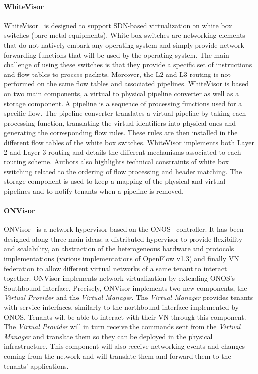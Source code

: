\paragraph{WhiteVisor}
WhiteVisor~\cite{whitevisor-Yu2019} is designed to support SDN-based virtualization on white box switches (\ie bare metal equipments).
White box switches are networking elements that do not natively embark any operating system and simply provide network forwarding functions that will be used by the operating system.  
The main challenge of using these switches is that they provide a specific set of instructions and flow tables to process packets. 
Moreover, the L2 and L3 routing is not performed on the same flow tables and associated pipelines.
WhiteVisor is based on two main components, a virtual to physical pipeline converter as well as a storage component.
A pipeline is a sequence of processing functions used for a specific flow.
The pipeline converter translates a virtual pipeline by taking each processing function, translating the virtual identifiers into physical ones and generating the corresponding flow rules. These rules are then installed in the different flow tables of the white box switches. WhiteVisor implements both Layer 2 and Layer 3 routing and details the different mechanisms associated to each routing scheme. Authors also highlights technical constraints of white box switching related to the ordering of flow processing and header matching. The storage component is used to keep a mapping of the physical and virtual pipelines and to notify tenants when a pipeline is removed. 


\paragraph{ONVisor}
ONVisor~\cite{ONVisor-Han2018} is a network hypervisor based on the ONOS~\cite{onos-Berde2014a} controller.
It has been designed along three main ideas: a distributed hypervisor to provide flexibility and scalability, an abstraction of the heterogeneous hardware and protocols implementations (\eg various implementations of OpenFlow v1.3)  and finally VN federation to allow different virtual networks of a same tenant to interact together.
ONVisor implements network virtualization by extending ONOS's Southbound interface.
Precisely, ONVisor implements two new components, the \textit{Virtual Provider} and the \textit{Virtual Manager}.
The \textit{Virtual Manager} provides tenants with service interfaces, similarly to the northbound interface implemented by ONOS. Tenants will be able to interact with their VN through this component.
The \textit{Virtual Provider} will in turn receive the commands sent from the \textit{Virtual Manager} and translate them so they can be deployed in the physical infrastructure. This component will also receive networking events and changes coming from the network and will translate them and forward them to the tenants' applications.

